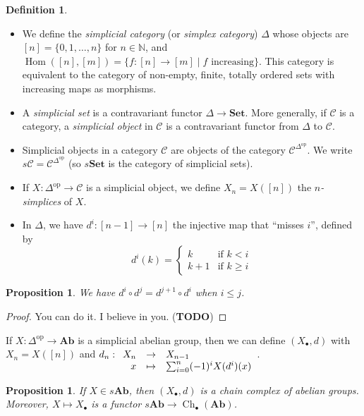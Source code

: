 \documentclass{article}
\newcommand{\op}{\mathrm{op}}
\newcommand{\N}{\mathbb{N}}
\newcommand{\cat}{\mathcal{C}}
\newcommand{\Set}{\mathbf{Set}}
\newcommand{\Ab}{\mathbf{Ab}}
\DeclareMathOperator{\Ch}{Ch}
\DeclareMathOperator{\Hom}{Hom}
\newcommand{\todo}{\textbf{TODO}}
\newcommand{\applic}[4]{\begin{array}[t]{rcl}
#1 & \to & #2 \\
#3 & \mapsto & #4
\end{array}}
\theoremstyle{plain}
\newtheorem{proposition}[theorem]{Proposition}
\theoremstyle{definition}
\newtheorem{definition}[theorem]{Definition}
\theoremstyle{remark}
\begin{document}
\begin{definition} \leavevmode
    \begin{itemize}
        \item We define the \emph{simplicial category} (or \emph{simplex category}) $\Delta$ whose objects are $[n] = \{0,1,\dots,n\}$ for $n \in \N$, and $\Hom([n],[m]) = \{f : [n] \to [m] \mid f \text{ increasing}\}$. This category is equivalent to the category of non-empty, finite, totally ordered sets with increasing maps as morphisms.
        \item A \emph{simplicial set} is a contravariant functor $\Delta \to \Set$. More generally, if $\cat$ is a category, a \emph{simplicial object} in $\cat$ is a contravariant functor from $\Delta$ to $\cat$.
        \item Simplicial objects in a category $\cat$ are objects of the category $\cat^{\Delta^\op}$. We write $s\cat = \cat^{\Delta^\op}$ (so $s\Set$ is the category of simplicial sets).
        \item If $X : \Delta^\op \to \cat$ is a simplicial object, we define $X_n = X([n])$ the \emph{$n$-simplices} of $X$.
        \item In $\Delta$, we have $d^i : [n-1] \to [n]$ the injective map that ``misses $i$'', defined by
        \[d^i(k) = \begin{cases}
            k & \text{if } k < i \\
            k+1 & \text{if } k \ge i
        \end{cases}\]
    \end{itemize}
\end{definition}

\begin{proposition}
    We have $d^i \circ d^j = d^{j+1} \circ d^i$ when $i\le j$.
\end{proposition}

\begin{proof}
    You can do it. I believe in you. (\todo)
\end{proof}

If $X : \Delta^\op \to \Ab$ is a simplicial abelian group, then we can define $(X_\bullet,d)$ with $X_n = X([n])$ and $d_n : \applic{X_n}{X_{n-1}}{x}{\sum_{i=0}^n (-1)^i X(d^i)(x)}$.
\begin{proposition} \label{ccfromsab}
    If $X \in s\Ab$, then $(X_\bullet,d)$ is a chain complex of abelian groups. Moreover, $X \mapsto X_\bullet$ is a functor $s\Ab \to \Ch_\bullet (\Ab)$.
\end{proposition}
\end{document}
